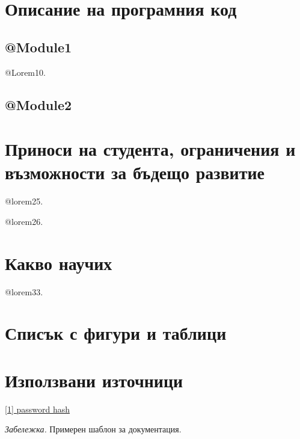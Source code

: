 \documentclass[12pt]{article}
\begin{document}
 
\section{Описание на програмния код}

\subsection{@Module1}
 @Lorem10.

\subsection{@Module2}

\medskip


\section{Приноси на студента, ограничения и възможности за бъдещо развитие}

@lorem25.

\medskip

\noindent @lorem26.

\section{Какво научих}
@lorem33.

\section{Списък с фигури и таблици}

\listoftables

\listoffigures

\section{Използвани източници}

\noindent\href{http://php.net/manual/en/function.password-hash.php}{[1] password hash}
 
\medskip



\bigskip

\noindent\textit{Забележка.} Примерен шаблон за документация.
\end{document}
